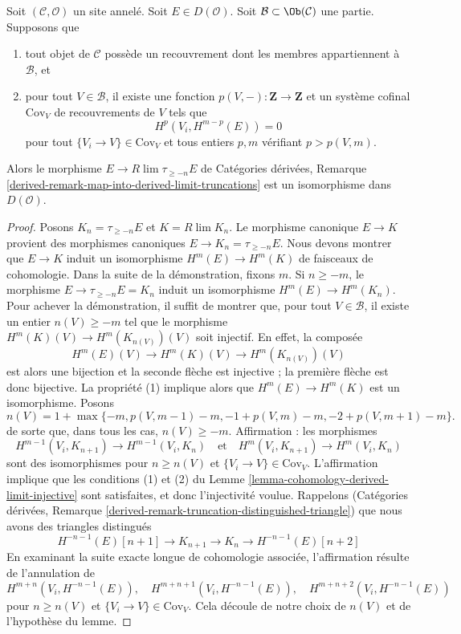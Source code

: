 \begin{lemma}
\label{lemma-is-limit-per-object}
Soit $(\mathcal{C}, \mathcal{O})$ un site annelé. Soit
$E \in D(\mathcal{O})$. Soit $\mathcal{B} \subset \Ob(\mathcal{C})$ une
partie. Supposons que
\begin{enumerate}
\item tout objet de $\mathcal{C}$ possède un recouvrement dont les membres
appartiennent à $\mathcal{B}$, et
\item pour tout $V \in \mathcal{B}$, il existe une fonction
$p(V, -) : \mathbf{Z} \to \mathbf{Z}$ et un système cofinal
$\text{Cov}_V$ de recouvrements de $V$ tels que
$$
H^p(V_i, H^{m - p}(E)) = 0
$$
pour tout $\{V_i \to V\} \in \text{Cov}_V$ et tous entiers $p, m$
vérifiant $p > p(V, m)$.
\end{enumerate}
Alors le morphisme $E \to R\lim \tau_{\geq -n} E$ de Catégories dérivées,
Remarque
\ref{derived-remark-map-into-derived-limit-truncations}
est un isomorphisme dans $D(\mathcal{O})$.
\end{lemma}

\begin{proof}
Posons $K_n = \tau_{\geq -n}E$ et $K = R\lim K_n$. Le morphisme canonique
$E \to K$ provient des morphismes canoniques
$E \to K_n = \tau_{\geq -n}E$. Nous devons montrer que $E \to K$ induit
un isomorphisme $H^m(E) \to H^m(K)$ de faisceaux de cohomologie. Dans la
suite de la démonstration, fixons $m$. Si $n \geq -m$, le morphisme
$E \to \tau_{\geq -n}E = K_n$ induit un isomorphisme
$H^m(E) \to H^m(K_n)$. Pour achever la démonstration, il suffit de montrer
que, pour tout $V \in \mathcal{B}$, il existe un entier $n(V) \geq -m$ tel
que le morphisme $H^m(K)(V) \to H^m(K_{n(V)})(V)$ soit injectif. En effet,
la composée
$$
H^m(E)(V) \to H^m(K)(V) \to H^m(K_{n(V)})(V)
$$
est alors une bijection et la seconde flèche est injective ; la première
flèche est donc bijective. La propriété (1) implique alors que
$H^m(E) \to H^m(K)$ est un isomorphisme. Posons
$$
n(V) = 1 + \max\{-m, p(V, m - 1) - m, -1 + p(V, m) - m, -2 + p(V, m + 1) - m\}.
$$
de sorte que, dans tous les cas, $n(V) \geq -m$. Affirmation : les
morphismes
$$
H^{m - 1}(V_i, K_{n + 1}) \to H^{m - 1}(V_i, K_n)
\quad\text{et}\quad
H^m(V_i, K_{n + 1}) \to H^m(V_i, K_n)
$$
sont des isomorphismes pour $n \geq n(V)$ et
$\{V_i \to V\} \in \text{Cov}_V$. L'affirmation implique que les
conditions (1) et (2) du Lemme
\ref{lemma-cohomology-derived-limit-injective} sont satisfaites, et donc
l'injectivité voulue. Rappelons (Catégories dérivées, Remarque
\ref{derived-remark-truncation-distinguished-triangle})
que nous avons des triangles distingués
$$
H^{-n - 1}(E)[n + 1] \to
K_{n + 1} \to K_n \to H^{-n - 1}(E)[n + 2]
$$
En examinant la suite exacte longue de cohomologie associée, l'affirmation
résulte de l'annulation de
$$
H^{m + n}(V_i, H^{-n - 1}(E)),\quad
H^{m + n + 1}(V_i, H^{-n - 1}(E)),\quad
H^{m + n + 2}(V_i, H^{-n - 1}(E))
$$
pour $n \geq n(V)$ et $\{V_i \to V\} \in \text{Cov}_V$. Cela découle de
notre choix de $n(V)$ et de l'hypothèse du lemme.
\end{proof}

